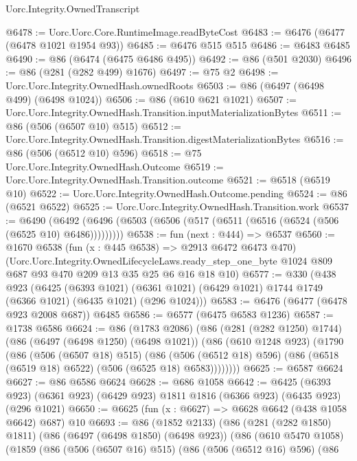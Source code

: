 \begin{lexlean}{Uorc.Integrity.OwnedTranscript}
\begin{coremodule}
@6478 := Uorc.Uorc.Core.RuntimeImage.readByteCost
@6483 := @6476 (@6477 (@6478 @1021 @1954 @93))
@6485 := @6476 @515 @515
@6486 := @6483 @6485
@6490 := @86 (@6474 (@6475 @6486 @495))
@6492 := @86 (@501 @2030)
@6496 := @86 (@281 (@282 @499) @1676)
@6497 := @75 @2
@6498 := Uorc.Uorc.Integrity.OwnedHash.ownedRoots
@6503 := @86 (@6497 (@6498 @499) (@6498 @1024))
@6506 := @86 (@610 @621 @1021)
@6507 := Uorc.Uorc.Integrity.OwnedHash.Transition.inputMaterializationBytes
@6511 := @86 (@506 (@6507 @10) @515)
@6512 := Uorc.Uorc.Integrity.OwnedHash.Transition.digestMaterializationBytes
@6516 := @86 (@506 (@6512 @10) @596)
@6518 := @75 Uorc.Uorc.Integrity.OwnedHash.Outcome
@6519 := Uorc.Uorc.Integrity.OwnedHash.Transition.outcome
@6521 := @6518 (@6519 @10)
@6522 := Uorc.Uorc.Integrity.OwnedHash.Outcome.pending
@6524 := @86 (@6521 @6522)
@6525 := Uorc.Uorc.Integrity.OwnedHash.Transition.work
@6537 := @6490
    (@6492 (@6496 (@6503 (@6506 (@517 (@6511 (@6516 (@6524 (@506 (@6525 @10) @6486)))))))))
@6538 := fun (next : @444) => @6537
@6560 := @1670
    @6538
    (fun (x : @445 @6538) => @2913 @6472 @6473 @470)
    (Uorc.Uorc.Integrity.OwnedLifecycleLaws.ready_step_one_byte
      @1024
      @809
      @687
      @93
      @470
      @209
      @13
      @35
      @25
      @6
      @16
      @18
      @10)
@6577 := @330
    (@438
      @923
      (@6425
        (@6393 @1021)
        (@6361 @1021)
        (@6429 @1021)
        @1744
        @1749
        (@6366 @1021)
        (@6435 @1021)
        (@296 @1024)))
@6583 := @6476 (@6477 (@6478 @923 @2008 @687)) @6485
@6586 := @6577 (@6475 @6583 @1236)
@6587 := @1738 @6586
@6624 := @86
    (@1783 @2086)
    (@86
      (@281 (@282 @1250) @1744)
      (@86
        (@6497 (@6498 @1250) (@6498 @1021))
        (@86
          (@610 @1248 @923)
          (@1790
            (@86
              (@506 (@6507 @18) @515)
              (@86
                (@506 (@6512 @18) @596)
                (@86 (@6518 (@6519 @18) @6522) (@506 (@6525 @18) @6583))))))))
@6625 := @6587 @6624
@6627 := @86 @6586 @6624
@6628 := @686 @1058
@6642 := @6425
    (@6393 @923)
    (@6361 @923)
    (@6429 @923)
    @1811
    @1816
    (@6366 @923)
    (@6435 @923)
    (@296 @1021)
@6650 := @6625 (fun (x : @6627) => @6628 @6642 (@438 @1058 @6642) @687) @10
@6693 := @86
    (@1852 @2133)
    (@86
      (@281 (@282 @1850) @1811)
      (@86
        (@6497 (@6498 @1850) (@6498 @923))
        (@86
          (@610 @5470 @1058)
          (@1859
            (@86
              (@506 (@6507 @16) @515)
              (@86
                (@506 (@6512 @16) @596)
                (@86

\end{coremodule}
\end{lexlean}
